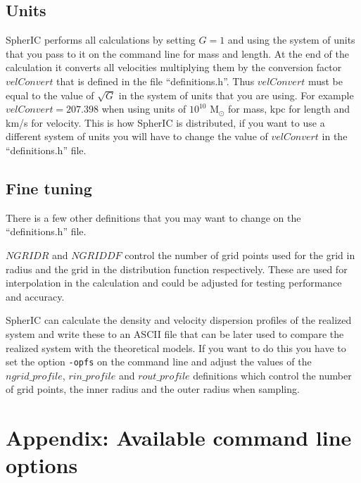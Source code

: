 \documentclass[letterpaper,10pt]{article}
\begin{document}
\subsection{Units}
SpherIC performs all calculations by setting $G = 1$ and using the system of units that you pass to it on the command line for mass and length. At the end of the calculation it converts all velocities multiplying them by the conversion factor $velConvert$ that is defined in the file ``definitions.h''. Thus $velConvert$ must be equal to the value of $\sqrt{G}$ in the system of units that you are using. For example $velConvert = 207.398$ when using units of $10^{10}$ $\mathrm{M}_{\odot}$ for mass, kpc for length and km/s for velocity. This is how SpherIC is distributed, if you want to use a different system of units you will have to change the value of $velConvert$ in the ``definitions.h'' file.

\subsection{Fine tuning}
There is a few other definitions that you may want to change on the ``definitions.h'' file.

 $NGRIDR$ and $NGRIDDF$ control the number of grid points used for the grid in radius and the grid in the distribution function respectively. These are used for interpolation in the calculation and could be adjusted for testing performance and accuracy.

SpherIC can calculate the density and velocity dispersion profiles of the realized system and write these to an ASCII file that can be later used to compare the realized system with the theoretical models. If you want to do this you have to set the option \texttt{-opfs} on the command line and adjust the values of  the $ngrid\_profile$, $rin\_profile$ and $rout\_profile$ definitions which control the number of grid points, the inner radius and the outer radius when sampling.

\section{Appendix: Available command line options}
\end{document}
